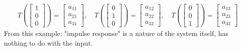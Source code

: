         \begin{equation}
            \begin{aligned}
                T(\begin{bmatrix}
                            1\\
                            0\\
                            0
                    \end{bmatrix}) = \begin{bmatrix}
                        a_{11}\\
                        a_{21}\\
                        a_{31}
                    \end{bmatrix},\quad
                T(\begin{bmatrix}
                            0\\
                            1\\
                            0
                    \end{bmatrix}) =\begin{bmatrix}
                        a_{12}\\
                        a_{22}\\
                        a_{32}
                    \end{bmatrix},\quad
                T(\begin{bmatrix}
                            0\\
                            0\\
                            1
                    \end{bmatrix})=\begin{bmatrix}
                        a_{13}\\
                        a_{23}\\
                        a_{33}
                    \end{bmatrix}
            \end{aligned}
        \end{equation}
    From this example: "impulse response" is a nature of the system itself, has nothing to do with the input.

